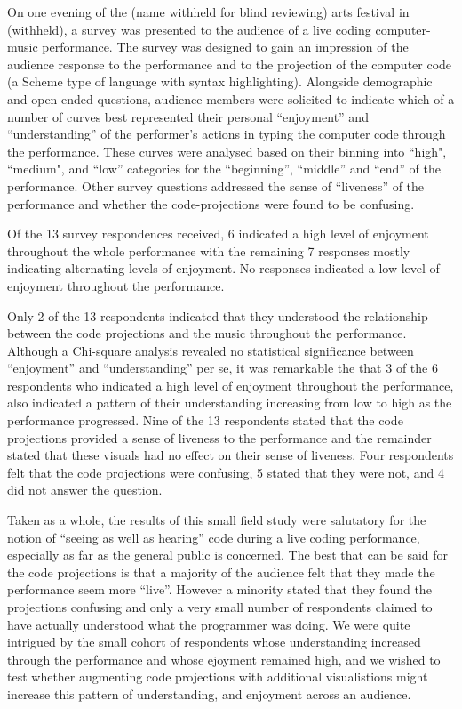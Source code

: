 \documentclass{sig-alternate}
\begin{document}
On one evening of the (name withheld for blind reviewing) arts festival in (withheld), a survey was presented to the audience of a live coding computer-music performance. The survey was designed to gain an impression of the audience response to the performance and to the projection of the computer code (a Scheme type of language with syntax highlighting). Alongside demographic and open-ended questions, audience members were solicited to indicate which of a number of curves best represented their personal ``enjoyment'' and ``understanding'' of the performer's actions in typing the computer code through the performance. These curves were analysed based on their binning into ``high", ``medium", and ``low'' categories for the ``beginning'', ``middle'' and ``end'' of the performance. Other survey questions addressed the sense of ``liveness'' of the performance \cite{Auslander} and whether the code-projections were found to be confusing.

Of the 13 survey respondences received, 6 indicated a high level of enjoyment throughout the whole performance with the remaining 7 responses mostly indicating alternating levels of enjoyment. No responses indicated a low level of enjoyment throughout the performance.

Only 2 of the 13 respondents indicated that they understood the relationship between the code projections and the music throughout the performance. Although a Chi-square analysis revealed no statistical significance between ``enjoyment'' and ``understanding'' per se, it was remarkable the that 3 of the 6 respondents who indicated a high level of enjoyment throughout the performance, also indicated a pattern of their understanding increasing from low to high as the performance progressed. Nine of the 13 respondents stated that the code projections provided a sense of liveness to the performance and the remainder stated that these visuals had no effect on their sense of liveness. Four respondents felt that the code projections were confusing, 5 stated that they were not, and 4 did not answer the question.

Taken as a whole, the results of this small field study were salutatory for the notion of ``seeing as well as hearing'' code during a live coding performance, especially as far as the general public is concerned. The best that can be said for the code projections is that a majority of the audience felt that they made the performance seem more ``live''. However a minority stated that they found the projections confusing and only a very small number of respondents claimed to have actually understood what the programmer was doing. We were quite intrigued by the small cohort of respondents whose understanding increased through the performance and whose ejoyment remained high, and we wished to test whether augmenting code projections with additional visualistions might increase this pattern of understanding, and enjoyment across an audience. 
\end{document}
